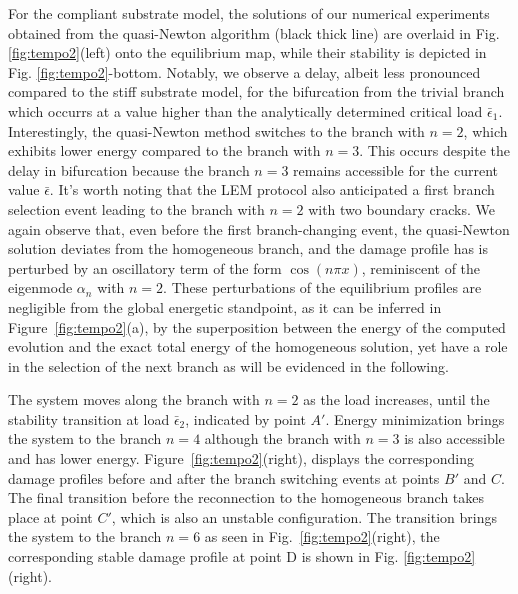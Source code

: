 For the compliant substrate model, the solutions of our numerical experiments obtained from the quasi-Newton algorithm (black thick line) are overlaid in Fig. \ref{fig:tempo2}(left) onto the equilibrium map, while their stability is depicted in Fig. \ref{fig:tempo2}-bottom. Notably, we observe a delay, albeit less pronounced compared to the stiff substrate model, for the bifurcation from the trivial branch which occurrs at a value  higher than the analytically determined critical load \(\bar{\epsilon}_1\). Interestingly, the quasi-Newton method switches to the branch with $n=2$, which exhibits lower energy compared to the branch with $n=3$. This occurs  despite the delay in bifurcation because the branch  $n=3$ remains accessible for the current value $\bar\epsilon$. It's worth noting that the LEM protocol also anticipated a first branch selection event leading to the branch with $n=2$ with two boundary cracks.
We again observe that, even before the first branch-changing event, the quasi-Newton solution {deviates from the homogeneous branch, and the damage profile has} is perturbed by an oscillatory term of the form \(\cos(n\pi x)\), reminiscent of the eigenmode $\alpha_n$  with \(n=2\).
These perturbations of the equilibrium profiles are negligible from the global energetic standpoint, as it can be inferred in Figure~\ref{fig:tempo2}(a), by the superposition between the energy of the computed evolution and the exact total energy of the homogeneous solution, yet have a role in the selection of the next branch as will be evidenced in the following.

The system moves along the branch with $n=2$  as the load increases, until the stability transition at load $\bar \epsilon_2$, indicated by point $A'$. Energy minimization brings the system to the branch $n=4$ although the branch with $n=3$ is also accessible and has lower energy. Figure~\ref{fig:tempo2}(right), displays the corresponding damage profiles before and after {the branch} switching events  at points $B'$ and $C$. The final {transition} before the reconnection to the homogeneous branch takes place at point $C'$, which is also an unstable configuration. The transition brings the system to the branch $n=6$ as seen in Fig.~\ref{fig:tempo2}(right), the corresponding stable damage profile at point D is shown in Fig. \ref{fig:tempo2}(right).


